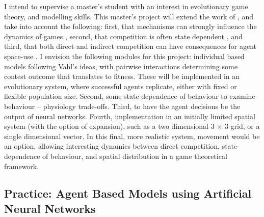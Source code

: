 I intend to supervise a master's student with an interest in
evolutionary game theory, and modelling skills. This master's project
will extend the work of \citet{vahl2006}, and take into account the
following: first, that mechanisms can strongly influence the dynamics of
games \citep{vandenberg2015a}, second, that competition is often state
dependent \citep{vangils2004}, and third, that both direct and indirect
competition \citep{vahl2005, bijleveld2012a} can have consequences for
agent space-use \citep{vahl2007a}. I envision the following modules for
this project: individual based models following Vahl's ideas, with
pairwise interactions determining some contest outcome that translates
to fitness. These will be implemented in an evolutionary system, where
successful agents replicate, either with fixed or flexible population
size. Second, some state dependence of behaviour to examine behaviour --
physiology trade-offs. Third, to have the agent decisions be the output
of neural networks. Fourth, implementation in an initially limited
spatial system (with the option of expansion), such as a two dimensional
3 × 3 grid, or a single dimensional vector. In this final, more
realistic system, movement would be an option, allowing interesting
dynamics between direct competition, state-dependence of behaviour, and
spatial distribution in a game theoretical framework.

\subsection{Practice: Agent Based Models using Artificial Neural Networks}

